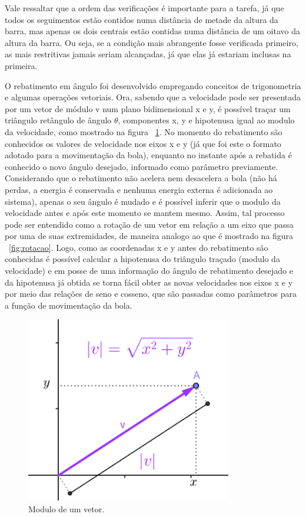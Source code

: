 \documentclass[conference]{IEEEtran}
\newcommand\largurafig{9cm}
\begin{document}
Vale ressaltar que a ordem das verificações é importante para a tarefa, já que todos os seguimentos estão contidos numa distância de metade da altura da barra, mas apenas os dois centrais estão contidas numa distância de um oitavo da altura da barra. Ou seja, se a condição mais abrangente fosse verificada primeiro, as mais restritivas jamais seriam alcançadas, já que elas já estariam inclusas na primeira.

O rebatimento em ângulo foi desenvolvido empregando conceitos de trigonometria e algumas operações vetoriais. Ora, sabendo que a velocidade pode ser presentada por um vetor de módulo v num plano bidimensional x e y, é possível traçar um triângulo retângulo de ângulo $\theta$, componentes x, y e hipotenusa igual ao modulo da velocidade, como mostrado na figura ~\ref{fig:modulo}. No momento do rebatimento são conhecidos os valores de velocidade nos eixos x e y (já que foi este o formato adotado para a movimentação da bola), enquanto no instante após a rebatida é conhecido o novo ângulo desejado, informado como parâmetro previamente. Considerando que o rebatimento não acelera nem desacelera a bola (não há perdas, a energia é conservada e nenhuma energia externa é adicionada ao sistema), apenas o seu ângulo é mudado e é possível inferir que o modulo da velocidade antes e após este momento se mantem mesmo. Assim, tal processo pode ser entendido como a rotação de um vetor em relação a um eixo que passa por uma de suas extremidades, de maneira analogo ao que é mostrado na figura ~\ref{fig:rotacao}. Logo, como as coordenadas x e y antes do rebatimento são conhecidas é possível calcular a hipotenusa do triângulo traçado (modulo da velocidade) e em posse de uma informação do ângulo de rebatimento desejado e da hipotenusa já obtida se torna fácil obter as novas velocidades nos eixos x e y por meio das relações de seno e cosseno, que são passadas como parâmetros para a função de movimentação da bola.

\begin{figure}[htbp]
\centerline{
    \includegraphics[width = \largurafig]{images/modulo_vetor.jpg}
    }
\caption{Modulo de um vetor.}
\label{fig:modulo}
\end{figure}
\end{document}
